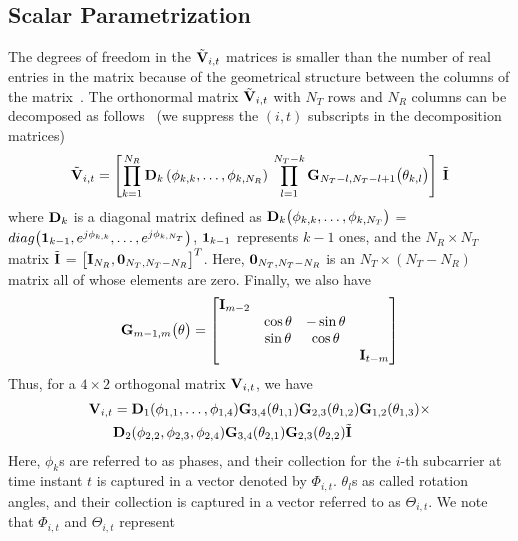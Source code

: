 \documentclass[journal,10pt,twocolumn]{IEEEtran}
\def\bD{{\bf D}}
\def\bG{{\bf G}}
\def\bI{{\bf I}}
\def\bV{{\bf V}}
\begin{document}
\subsection{Scalar Parametrization}
\label{givens}
The degrees of freedom in the $\tilde{\bV}_{i,t}$ matrices is smaller
than the number of real entries in the matrix because of the
geometrical structure between the columns of the
matrix~\cite{4114278}. The orthonormal matrix $\tilde{\bV}_{i,t}$ with
$N_T$ rows and $N_R$ columns can be decomposed as
follows~\cite{4114278} (we suppress the $(i, t)$ subscripts in the
decomposition matrices)
\begin{equation}
\tilde{\bV}_{i,t} = \left[\prod_{k=1}^{N_{R}} \bD_{k} \left( \phi_{k,k},\ldots , \phi_{k,N_{R}} \right) \:  \prod_{l=1}^{N_{T}-k} \bG_{N_{T}-l,N_{T} -l+1} \big( \theta_{k,l}\big)  \right] \: \tilde{\bI}
\end{equation}
where $\bD_{k}$ is a diagonal matrix defined as
$\bD_{k}\big(\phi_{k,k}, \ldots, \phi_{k,N_T } \big)$ =
$\mbox{diag}\big( {\bf 1}_{k-1}, e^{j\phi_{k,k}},\ldots,
e^{j\phi_{k,N_T }} \big)$, ${\bf 1}_{k-1}$ represents $k-1$ ones,
and the $N_R \times N_T$ matrix $\tilde{\bI}$ =
$\big[\bI_{N_R }, {\bf 0}_{N_T ,N_T -N_R}\big]^{T}$. Here,
${\bf 0}_{N_T ,N_T -N_R }$ is an $N_T\times (N_T - N_R)$ matrix all of
whose elements are zero. Finally, we also have
\begin{equation}
\bG_{m-1,m}\big(\theta\big)  =
\begin{bmatrix}
\bI_{m-2} & & & \\
& \cos\theta & -\sin\theta & \\
& \sin\theta & \cos\theta & \\
& & & \bI_{t-m}
\end{bmatrix}
\end{equation}
Thus, for a $4 \times 2$ orthogonal matrix $\bV_{i,t}$, we have
\begin{align*}
  \bV_{i,t} & =
  \bD_{1}(\phi_{1,1},\ldots,\phi_{1,4})\bG_{3,4}(\theta_{1,1})
  \bG_{2,3}(\theta_{1,2}) \bG_{1,2}(\theta_{1,3})\times\\
& \bD_{2}(\phi_{2,2},\phi_{2,3},\phi_{2,4}) \bG_{3,4}(\theta_{2,1}) \bG_{2,3}(\theta_{2,2})\tilde{\bI}
\end{align*}
Here, $\phi_{k}$s are referred to as phases, and their collection for
the $i$-th subcarrier at time instant $t$ is captured in a vector
denoted by $\Phi_{i,t}$. $\theta_{l}$s as called rotation angles, and
their collection is captured in a vector referred to as
$\Theta_{i,t}$. We note that $\Phi_{i,t}$ and $\Theta_{i,t}$ represent
\end{document}
